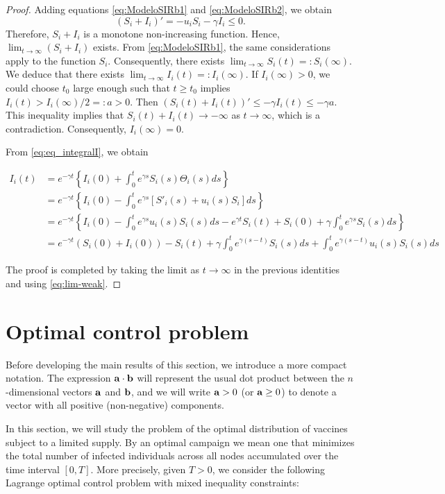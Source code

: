\documentclass[a4paper,10pt]{article}
\theoremstyle{remark}
\begin{document}
\begin{proof} Adding equations \eqref{eq:ModeloSIRb1} and \eqref{eq:ModeloSIRb2}, we obtain
\[
 (S_i+I_i)'=- u_iS_i-\gamma I_i\leq 0.
\]
Therefore, $S_i+I_i$ is a monotone non-increasing function. Hence, $\lim_{t\to\infty} (S_i+I_i)$ exists. From \eqref{eq:ModeloSIRb1}, the same considerations apply to the function $S_i$. Consequently, there exists $\lim_{t\to\infty} S_i(t)=:S_i(\infty)$. We deduce that there exists $\lim_{t\to\infty} I_i(t)=:I_i(\infty)$. If $I_i(\infty)>0$, we could choose $t_0$ large enough such that $t\geq t_0$ implies $I_i(t)>I_i(\infty)/2=:a>0$. Then $(S_i(t)+I_i(t))'\leq -\gamma I_i(t)\leq -\gamma a$. This inequality implies that $S_i(t) +I_i(t)\to -\infty$ as $t\to\infty$, which is a contradiction. Consequently, $I_i(\infty)=0$.

From \eqref{eq:eq_integralI}, we obtain

\[
\begin{split}
 I_i(t)&=e^{-\gamma t}
 \left\{
    I_i(0)+\int_0^t e^{\gamma s} S_{i}(s) \Theta_i(s)ds
\right\}\\
&= e^{-\gamma t}
 \left\{
    I_i(0)-\int_0^t e^{\gamma s} \left[S'_i(s)+ u_i(s)S_i\right]ds
  \right\}\\
  &= e^{-\gamma t}
 \left\{
    I_i(0)-\int_0^t e^{\gamma s}   u_i(s)S_i(s)ds
    -e^{\gamma t}S_i(t)+S_i(0)+\gamma\int_0^t e^{\gamma s} S_{i}(s) ds
  \right\}\\
   &= e^{-\gamma t}\left(S_i(0)+ I_i(0)  \right)-S_i(t)
   +\gamma \int_0^t e^{\gamma (s-t)}S_{i}(s)ds+\int_0^t e^{\gamma (s-t)}   u_i(s)S_i(s)ds
 \end{split}
\]

The proof is completed by taking the limit as $t\to\infty$ in the previous identities and using \eqref{eq:lim-weak}.
\end{proof}


\section{Optimal control problem}
Before developing the main results of this section, we introduce a more compact notation. The expression $\bold{a}\cdot\bold{b}$ will represent the usual dot product between the $n$-dimensional vectors $\bold{a}$ and $\bold{b}$, and we will write $\bold{a}>0$ (or $\bold{a}\geq 0$) to denote a vector with all positive (non-negative) components.

In this section, we will study the problem of the optimal distribution of vaccines subject to a limited supply. By an optimal campaign we mean one that minimizes the total number of infected individuals across all nodes accumulated over the time interval $[0,T]$. More precisely, given $T>0$, we consider the following Lagrange optimal control problem with mixed inequality constraints:
\end{document}
